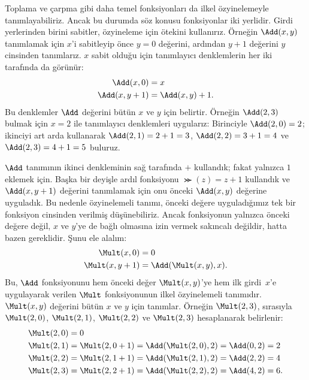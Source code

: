 Toplama ve çarpma gibi daha temel fonksiyonları da ilkel özyinelemeyle
tanımlayabiliriz. Ancak bu durumda söz konusu fonksiyonlar iki
yerlidir. Girdi yerlerinden birini sabitler, özyineleme için ötekini
kullanırız. Örneğin $\Add(x,y)$ tanımlamak için $x$'i sabitleyip önce
$y=0$ değerini, ardından $y+1$ değerini $y$ cinsinden tanımlarız.
$x$ sabit olduğu için tanımlayıcı denklemlerin her iki tarafında da
görünür:
\begin{align*}
\Add(x,0) & = x\\
\Add(x,y+1) & = \Add(x,y)+1.
\end{align*}
Bu denklemler $\Add$ değerini bütün $x$ ve $y$ için belirtir. Örneğin
$\Add(2,3)$ bulmak için $x=2$ ile tanımlayıcı denklemleri uygularız:
Birinciyle $\Add(2,0)=2$; ikinciyi art arda kullanarak
$\Add(2,1)=2+1=3$, $\Add(2,2)=3+1=4$ ve $\Add(2,3)=4+1=5$ buluruz.

$\Add$ tanımının ikinci denkleminin sağ tarafında $+$ kullandık; fakat
yalnızca $1$ eklemek için. Başka bir deyişle ardıl fonksiyonu
$\Succ(z)=z+1$ kullandık ve $\Add(x,y+1)$ değerini tanımlamak için onu
önceki $\Add(x,y)$ değerine uyguladık. Bu nedenle özyinelemeli tanımı,
önceki değere uyguladığımız tek bir fonksiyon cinsinden verilmiş
düşünebiliriz. Ancak fonksiyonun yalnızca önceki değere değil, $x$ ve
$y$'ye de bağlı olmasına izin vermek sakıncalı değildir, hatta bazen
gereklidir. Şunu ele alalım:
\begin{align*}
  \Mult(x,0) & = 0 \\
  \Mult(x,y+1) & = \Add(\Mult(x,y),x).
\end{align*}
Bu, $\Add$ fonksiyonunu hem önceki değer $\Mult(x,y)$'ye hem ilk
girdi~$x$'e uygulayarak verilen $\Mult$ fonksiyonunun ilkel
özyinelemeli tanımıdır. $\Mult(x,y)$ değerini bütün $x$ ve $y$ için
tanımlar. Örneğin $\Mult(2,3)$, sırasıyla $\Mult(2,0)$,
$\Mult(2,1)$, $\Mult(2,2)$ ve $\Mult(2,3)$ hesaplanarak belirlenir:
\begin{align*}
  \Mult(2,0) & = 0\\
  \Mult(2,1) & = \Mult(2,0+1) =
  \Add(\Mult(2,0), 2) = \Add(0, 2) = 2\\
  \Mult(2,2) & = \Mult(2,1+1) =
  \Add(\Mult(2,1), 2) = \Add(2, 2) = 4\\
  \Mult(2,3) & = \Mult(2,2+1) =
  \Add(\Mult(2,2), 2) = \Add(4, 2) = 6.
\end{align*}

